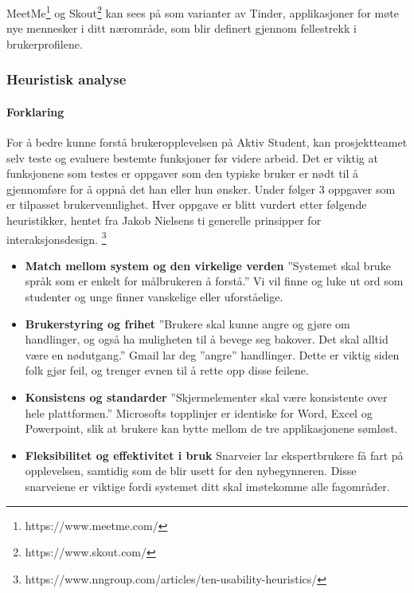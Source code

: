 MeetMe\footnote{https://www.meetme.com/} og Skout\footnote{https://www.skout.com/} kan sees på som varianter av Tinder, applikasjoner for møte nye mennesker i ditt nærområde, som blir definert gjennom fellestrekk i brukerprofilene.

\subsubsection{Heuristisk analyse}

\paragraph{Forklaring}

For å bedre kunne forstå brukeropplevelsen på Aktiv Student, kan prosjektteamet selv teste og evaluere bestemte funksjoner før videre arbeid. Det er viktig at funksjonene som testes er oppgaver som den typiske bruker er nødt til å gjennomføre for å oppnå det han eller hun ønsker.
\linebreak 
Under følger 3 oppgaver som er tilpasset brukervennlighet. Hver oppgave er blitt vurdert etter følgende heuristikker, hentet fra Jakob Nielsens ti generelle prinsipper for interaksjonsdesign. \footnote{https://www.nngroup.com/articles/ten-usability-heuristics/}

 \begin{itemize}
    \item \textbf{Match mellom system og den virkelige verden}   %
          ''Systemet skal bruke språk som er enkelt for målbrukeren å forstå.'' Vi vil finne og luke ut ord som studenter og unge finner vanskelige eller uforståelige.   %
    \item \textbf{Brukerstyring og frihet} 
            ''Brukere skal kunne angre og gjøre om handlinger, og også ha muligheten til å bevege seg bakover. Det skal alltid være en nødutgang.'' Gmail lar deg ''angre'' handlinger. Dette er viktig siden folk gjør feil, og trenger evnen til å rette opp disse feilene.
    \item \textbf{Konsistens og standarder}  %
          ''Skjermelementer skal være konsistente over hele plattformen.''
            Microsofts topplinjer er identiske for Word, Excel og Powerpoint, slik at brukere kan bytte mellom de tre applikasjonene sømløst.   %
    \item \textbf{Fleksibilitet og effektivitet i bruk} 
            Snarveier lar ekspertbrukere få fart på opplevelsen, samtidig som de blir usett for den nybegynneren. Disse snarveiene er viktige fordi systemet ditt skal imøtekomme alle fagområder.
\end{itemize}


